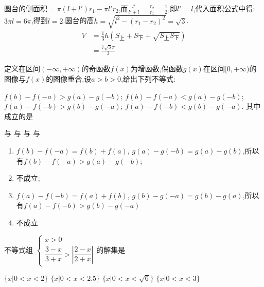 \begin{questions}
\begin{solution}
		圆台的侧面积$=\pi(l+l')r_1 - \pi l'r_2$,而$\frac{l'}{l'+l}=\frac{r_2}{r_1}=\frac12$,即$l'=l$,代入面积公式中得:
		$3\pi l = 6\pi$,得到$l=2$.圆台的高$h=\sqrt{l^2-(r_1-r_2)^2}=\sqrt{3}$.
		\begin{align*}
			V & = \frac13h{(S_上 + S_下 + \sqrt{S_上S_下})} \\
			  & = \frac{7\sqrt{3}\pi}{3}
		\end{align*}
	\end{solution}

	\question
	定义在区间$(-\infty,+\infty)$的奇函数$f(x)$为增函数,偶函数$g(x)$在区间$[0,+\infty)$的图像与$f(x)$的图像重合,设$a>b>0$,给出下列不等式:

	$f(b)-f(-a)>g(a)-g(-b)$; $f(b)-f(-a) < g(a) - g(-b)$;
	$f(a)-f(-b) > g(b) - g(-a)$; $f(a)-f(-b) < g(b) - g(-a)$.
	其中成立的是 \hfs

	\begin{oneparchoices}
		\choice {}与
		\choice {}与
		\CorrectChoice {}与
		\choice {}与
	\end{oneparchoices}

	\begin{solution}
		\begin{enumerate}[label=\protect\circled{\arabic*}]
			\item $f(b) - f(-a) = f(b)+f(a)$, $g(a) - g(-b) = g(a) - g(b)$,所以有$f(b)-f(-a) > g(a) - g(-b)$;
			\item 不成立;
			\item $f(a) - f(-b) = f(a) + f(b)$, $g(b) - g(-a)= g(b) - g(a)$,所以有$f(a) - f(-b) > g(b) - g(-a)$
			\item 不成立
		\end{enumerate}
	\end{solution}

	\question 不等式组 \begin{math}
		\begin{cases}
			x> 0 \\
			\dfrac{3-x}{3+x} > \left|\dfrac{2-x}{2+x}\right|
		\end{cases}
	\end{math}的解集是 \hfs

	\begin{oneparchoices}
		\choice $\{x|0< x < 2\}$
		\choice $\{x|0< x < 2.5\}$
		\CorrectChoice $\{x|0< x < \sqrt{6}\}$
		\choice $\{x|0< x < 3\}$
	\end{oneparchoices}


\end{questions}
